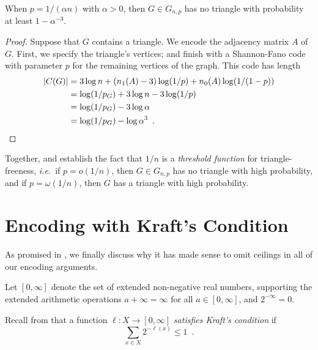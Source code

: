 \documentclass{patmorin}
\newcommand{\aremark}[3]{\textcolor{blue}{\textsc{#1 #2:}}
  \textcolor{red}{\textsf{#3}}}
\newcommand{\tommy}[2][says]{\aremark{Tommy}{#1}{#2}}
\newcommand{\wolfgang}[2][says]{\aremark{Wolfgang}{#1}{#2}}
\begin{document}
\begin{thm}
  When $p = 1/(\alpha n)$ with $\alpha > 0$, then $G \in G_{n, p}$ has no triangle with
  probability at least $1 - \alpha^{-3}$.
\end{thm}
\begin{proof}
  Suppose that $G$ contains a triangle. We encode the adjacency matrix
  $A$ of $G$. First, we specify the triangle's vertices; and finish
  with a Shannon-Fano code with parameter $p$ for the remaining
  vertices of the graph. This code has length
  \begin{align*}
    |C(G)| &= 3 \log n + (n_1(A) - 3) \log (1/p) + n_0(A) \log (1/(1 - p)) \\
           &= \log (1/p_G) + 3 \log n - 3 \log (1/p) \\
           &= \log (1/p_G) - 3 \log \alpha \\
           &= \log (1/p_G) - \log \alpha^3 \enspace . \qedhere
  \end{align*}
\end{proof}

Together,  and  establish
the fact that $1/n$ is a \emph{threshold function} for
triangle-freeness, \emph{i.e.}~if $p = o(1/n)$, then $G \in G_{n, p}$
has no triangle with high probability, and if $p = \omega(1/n)$, then
$G$ has a triangle with high probability. 

\section{Encoding with Kraft's Condition}

As promised in , we finally discuss why it has made
sense to omit ceilings in all of our encoding arguments.

Let $[0, \infty]$ denote the set of extended non-negative real
numbers, supporting the extended arithmetic operations
$a + \infty = \infty$ for all $a \in [0, \infty]$, and
$2^{-\infty} = 0$.

  Recall from 
that a function $\ell : X \to [0, \infty]$ \emph{satisfies Kraft's
  condition} if
\[
  \sum_{x \in X} 2^{-\ell(x)} \leq 1 \enspace .
\]
\end{document}
